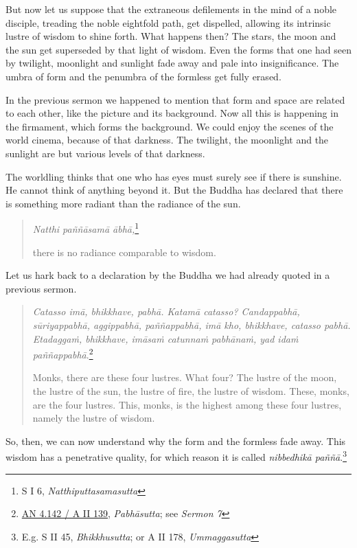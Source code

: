 \enlargethispage{\baselineskip}

But now let us suppose that the extraneous defilements in the mind of a noble disciple, treading the noble eightfold path, get dispelled, allowing its intrinsic lustre of wisdom to shine forth. What happens then? The stars, the moon and the sun get superseded by that light of wisdom. Even the forms that one had seen by twilight, moonlight and sunlight fade away and pale into insignificance. The umbra of form and the penumbra of the formless get fully erased.

In the previous sermon we happened to mention that form and space are related to each other, like the picture and its background. Now all this is happening in the firmament, which forms the background. We could enjoy the scenes of the world cinema, because of that darkness. The twilight, the moonlight and the sunlight are but various levels of that darkness.

The worldling thinks that one who has eyes must surely see if there is sunshine. He cannot think of anything beyond it. But the Buddha has declared that there is something more radiant than the radiance of the sun.

\begin{quote}
\emph{Natthi paññāsamā ābhā,}\footnote{S I 6, \emph{Natthiputtasamasutta}}

there is no radiance comparable to wisdom.
\end{quote}

Let us hark back to a declaration by the Buddha we had already quoted in a previous sermon.

\begin{quote}
\emph{Catasso imā, bhikkhave, pabhā. Katamā catasso? Candappabhā, sūriyappabhā, aggippabhā, paññappabhā, imā kho, bhikkhave, catasso pabhā. Etadaggaṁ, bhikkhave, imāsaṁ catunnaṁ pabhānaṁ, yad idaṁ paññappabhā}.\footnote{\href{https://suttacentral.net/an4.142/pli/ms}{AN 4.142 / A II 139}, \emph{Pabhāsutta}; see \emph{Sermon 7}}

Monks, there are these four lustres. What four? The lustre of the moon, the lustre of the sun, the lustre of fire, the lustre of wisdom. These, monks, are the four lustres. This, monks, is the highest among these four lustres, namely the lustre of wisdom.
\end{quote}

So, then, we can now understand why the form and the formless fade away. This wisdom has a penetrative quality, for which reason it is called \emph{nibbedhikā paññā}.\footnote{E.g. S II 45, \emph{Bhikkhusutta}; or A II 178, \emph{Ummaggasutta}}

